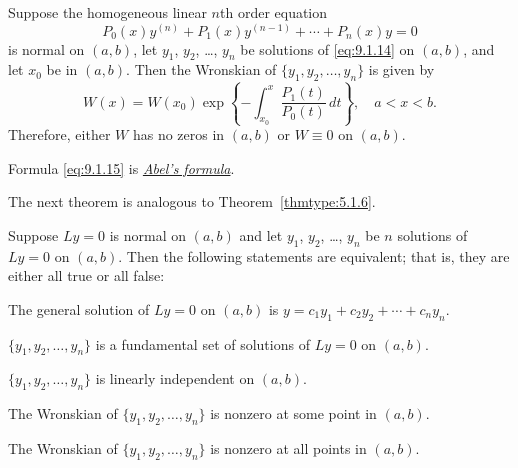 \begin{theorem}
  \color{blue}
  \label{thmtype:9.1.3} Suppose the homogeneous linear $n$th order equation
  \begin{equation}
    \label{eq:9.1.14}P_{0}(x)y^{(n)}+P_{1}(x)y^{(n-1)}+\cdots+P_{n}(x)y=0
  \end{equation}
  is normal on $(a,b)$, let $y_{1}$, $y_{2}$, \dots, $y_{n}$ be solutions of \eqref{eq:9.1.14} on
  $(a,b)$, and let $x_{0}$ be in $(a,b)$. Then the Wronskian of $\{y_{1},y_{2},\dots,y_{n}\}$ is
  given by
  \begin{equation}
    \label{eq:9.1.15}W(x)=W(x_{0})\exp\left\{-\int^{x}_{x_{0}}\frac{P_{1}(t)}{P_{0}(t)}\, dt\right\},\quad a<x<b.
  \end{equation}
  Therefore, either $W$ has no zeros in $(a,b)$ or $W\equiv0$ on $(a,b)$.
\end{theorem}

Formula \eqref{eq:9.1.15} is
\href{https://mathshistory.st-andrews.ac.uk/Biographies/Abel/}{\color{blue}
\it Abel's formula\/}.

The next theorem is analogous to Theorem~\ref{thmtype:5.1.6}.

\begin{theorem}
  \color{blue}
  \label{thmtype:9.1.4} Suppose $Ly=0$ is normal on $(a,b)$ and let $y_{1}$, $y_{2}$, \dots, $y_{n}$
  be $n$ solutions of $Ly=0$ on $(a,b)$. Then the following statements are equivalent; that is, they
  are either all true or all false:
  \begin{alist}
    \item %
    The general solution of $Ly=0$ on $(a,b)$ is $y=c_{1}y_{1}+c_{2}y_{2}+\cdots+c_{n}y_{n}$.

    \item %
    $\{y_{1},y_{2},\dots,y_{n}\}$ is a fundamental set of solutions of $Ly=0$ on $(a,b)$.

    \item %
    $\{y_{1},y_{2},\dots,y_{n}\}$ is linearly independent on $(a,b)$.

    \item %
    The Wronskian of $\{y_{1},y_{2},\dots,y_{n}\}$ is nonzero at some point in $(a,b)$.

    \item %
    The Wronskian of $\{y_{1},y_{2},\dots,y_{n}\}$ is nonzero at all points in $(a,b)$.
  \end{alist}
\end{theorem}

